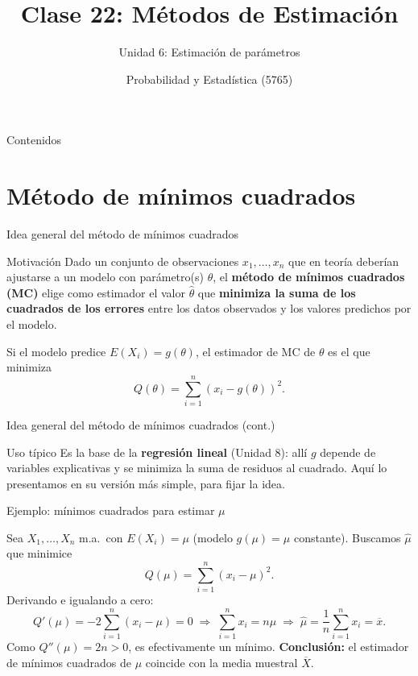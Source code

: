 \documentclass[aspectratio=169,11pt]{beamer}
\title[Prob. y Estadística]{Clase 22: Métodos de Estimación}
\subtitle{Unidad 6: Estimación de parámetros}
\institute[UNS]{Universidad Nacional del Sur \\ Departamento de Matemática}
\author{Probabilidad y Estadística (5765)}
\date{}
\begin{document}
\begin{frame}
\titlepage
\end{frame}

\begin{frame}{Contenidos}
\tableofcontents
\end{frame}

\section{Método de mínimos cuadrados}

\begin{frame}{Idea general del método de mínimos cuadrados}
\begin{block}{Motivación}
Dado un conjunto de observaciones $x_1,\dots,x_n$ que en teoría deberían ajustarse a un modelo con parámetro(s) $\theta$, el \textbf{método de mínimos cuadrados (MC)} elige como estimador el valor $\widehat\theta$ que \textbf{minimiza la suma de los cuadrados de los errores} entre los datos observados y los valores predichos por el modelo.
\end{block}

\begin{definition}
Si el modelo predice $E(X_i) = g(\theta)$, el estimador de MC de $\theta$ es el que minimiza
\[
Q(\theta) = \sum_{i=1}^n \left(x_i - g(\theta)\right)^2.
\]
\end{definition}

\end{frame}

\begin{frame}{Idea general del método de mínimos cuadrados (cont.)}
\begin{alertblock}{Uso típico}
Es la base de la \textbf{regresión lineal} (Unidad 8): allí $g$ depende de variables explicativas y se minimiza la suma de residuos al cuadrado. Aquí lo presentamos en su versión más simple, para fijar la idea.
\end{alertblock}
\end{frame}

\begin{frame}{Ejemplo: mínimos cuadrados para estimar $\mu$}
\begin{example}
Sea $X_1,\dots,X_n$ m.a.\ con $E(X_i)=\mu$ (modelo $g(\mu)=\mu$ constante). Buscamos $\widehat\mu$ que minimice
\[
Q(\mu) = \sum_{i=1}^n (x_i-\mu)^2.
\]
Derivando e igualando a cero:
\[
Q'(\mu) = -2\sum_{i=1}^n (x_i-\mu) = 0 \;\Longrightarrow\; \sum_{i=1}^n x_i = n\mu \;\Longrightarrow\; \widehat\mu = \frac{1}{n}\sum_{i=1}^n x_i = \overline x.
\]
Como $Q''(\mu) = 2n>0$, es efectivamente un mínimo. \textbf{Conclusión:} el estimador de mínimos cuadrados de $\mu$ coincide con la media muestral $\overline X$.
\end{example}
\end{frame}
\end{document}
